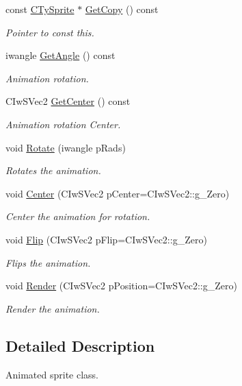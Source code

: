 \begin{DoxyCompactItemize}
const \hyperlink{class_c_ty_sprite}{CTySprite} $\ast$ \hyperlink{class_c_ty_sprite_ad43a63fdfd4d60c2b5c78bcfe5f7fced}{GetCopy} () const 
\begin{DoxyCompactList}\small\item\em Pointer to const this. \end{DoxyCompactList}\item 
iwangle \hyperlink{class_c_ty_sprite_af4e75e0923094162c46023184e2bc5d5}{GetAngle} () const 
\begin{DoxyCompactList}\small\item\em Animation rotation. \end{DoxyCompactList}\item 
CIwSVec2 \hyperlink{class_c_ty_sprite_a49e66d883dd0529d4943bf1fddcfd823}{GetCenter} () const 
\begin{DoxyCompactList}\small\item\em Animation rotation Center. \end{DoxyCompactList}\item 
void \hyperlink{class_c_ty_sprite_ab015a500d951d37225a5bbb64c7a567c}{Rotate} (iwangle pRads)
\begin{DoxyCompactList}\small\item\em Rotates the animation. \end{DoxyCompactList}\item 
void \hyperlink{class_c_ty_sprite_aadeb6c6624411648967e2fcc7494b4be}{Center} (CIwSVec2 pCenter=CIwSVec2::g\_\-Zero)
\begin{DoxyCompactList}\small\item\em Center the animation for rotation. \end{DoxyCompactList}\item 
void \hyperlink{class_c_ty_sprite_a288e9a75afb2177c7fad580802c2a3af}{Flip} (CIwSVec2 pFlip=CIwSVec2::g\_\-Zero)
\begin{DoxyCompactList}\small\item\em Flips the animation. \end{DoxyCompactList}\item 
void \hyperlink{class_c_ty_sprite_aa86cd094757ca9c8b52a32f090618eb3}{Render} (CIwSVec2 pPosition=CIwSVec2::g\_\-Zero)
\begin{DoxyCompactList}\small\item\em Render the animation. \end{DoxyCompactList}\end{DoxyCompactItemize}


\subsection{Detailed Description}
Animated sprite class. 

